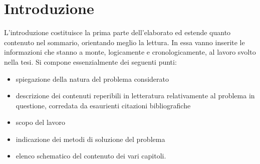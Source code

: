 \chapter{Introduzione}

L'introduzione costituisce la prima parte dell'elaborato ed estende quanto contenuto nel
sommario, orientando meglio la lettura. In essa vanno inserite le informazioni che stanno a
monte, logicamente e cronologicamente, al lavoro svolto nella tesi. Si compone
essenzialmente dei seguenti punti:
\begin{itemize}
\item spiegazione della natura del problema considerato
\item descrizione dei contenuti reperibili in letteratura relativamente al problema in
questione, corredata da esaurienti citazioni bibliografiche
\item scopo del lavoro
\item indicazione dei metodi di soluzione del problema
\item elenco schematico del contenuto dei vari capitoli.
\end{itemize}